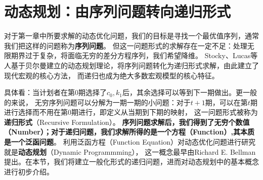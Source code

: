 
\section{动态规划：由序列问题转向递归形式}  \label{sec-sp-fe}

对于第一章中所要求解的动态优化问题，我们的目标是寻找一个最优值序列，通常我们把这样的问题称为\textbf{序列问题}。
但这一问题形式的求解存在一定不足：处理无限期界过于复杂，将面临无穷的差分方程序列，我们希望降维。
Stocky、Lucas等人基于贝尔曼建立的动态规划理论，将序列问题转化为递归形式求解，由此建立了现代宏观的核心方法，
而递归也成为绝大多数宏观模型的核心特征。

具体看：当计划者在第0期选择了$c_0,k_1$后，其余选择可以等到下一期做出。更一般的来说，
无穷序列问题可以分解为一期一期的小问题：对于$t+1$期，可以在第$t$期进行选择而不用在第0期进行，即定义从当期到下期的映射，
这一问题形式被称为\textbf{递归形式}（Recursive Formulation）。
\textbf{序列问题求解后，我们得到了无穷个数值（Number）；对于递归问题，我们求解所得的是一个方程（Function）,其本质是一个泛函问题}。
利用泛函方程（Function Equation）对动态优化问题进行研究就是\textbf{动态规划}（Dynamic Programmming），
这一概念最早由Richard E. Bellman提出。在本节，我们将建立一般化形式的递归问题，进而对动态规划中的基本概念进行初步介绍。


